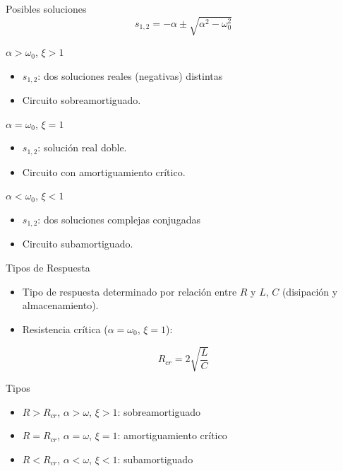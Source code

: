 \documentclass[xcolor={usenames,svgnames,dvipsnames}]{beamer}
\begin{document}
\begin{frame}[label={sec:orgb2ad7c7}]{Posibles soluciones}
\[
  \boxed{s_{1,2} = -\alpha \pm \sqrt{\alpha^2 - \omega_0^2}}
\]

\begin{block}{\(\alpha > \omega_0\), \(\xi > 1\)}
\begin{itemize}
\item \(s_{1,2}\): dos soluciones reales (negativas) distintas
\item Circuito \alert{sobreamortiguado}.
\end{itemize}
\end{block}

\begin{block}{\(\alpha = \omega_0\), \(\xi = 1\)}
\begin{itemize}
\item \(s_{1,2}\): solución real doble.
\item Circuito con \alert{amortiguamiento crítico}.
\end{itemize}
\end{block}

\begin{block}{\(\alpha < \omega_0\), \(\xi < 1\)}
\begin{itemize}
\item \(s_{1,2}\): dos soluciones complejas conjugadas
\item Circuito \alert{subamortiguado}.
\end{itemize}
\end{block}
\end{frame}

\begin{frame}[label={sec:org6f1cc83}]{Tipos de Respuesta}
\begin{itemize}
\item Tipo de respuesta determinado por relación entre \(R\) y \(L\), \(C\) (disipación y almacenamiento).
\item Resistencia crítica (\(\alpha = \omega_0\), \(\xi = 1\)):
\end{itemize}

\[
  R_{cr} = 2\sqrt{\frac{L}{C}}
\]

\begin{block}{Tipos}
\begin{itemize}
\item \(R > R_{cr}\), \(\alpha > \omega\), \(\xi > 1\): \alert{sobreamortiguado}
\item \(R = R_{cr}\),  \(\alpha = \omega\), \(\xi = 1\): \alert{amortiguamiento crítico}
\item \(R < R_{cr}\),  \(\alpha < \omega\), \(\xi < 1\): \alert{subamortiguado}
\end{itemize}
\end{block}
\end{frame}
\end{document}
